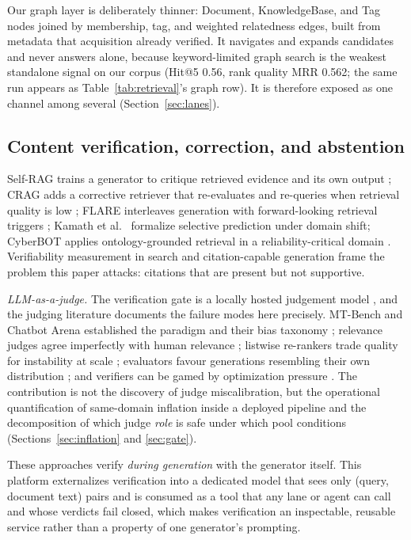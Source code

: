 Our graph layer is deliberately thinner: Document, KnowledgeBase, and Tag nodes
joined by membership, tag, and weighted relatedness edges, built from metadata
that acquisition already verified. It navigates and expands candidates and never
answers alone, because keyword-limited graph search is the weakest standalone
signal on our corpus (Hit@5 0.56, rank quality MRR 0.562; the same run
appears as Table~\ref{tab:retrieval}'s graph row). It is therefore exposed as one channel among
several (Section~\ref{sec:lanes}).

\subsection{Content verification, correction, and abstention}
Self-RAG trains a generator to critique retrieved evidence and its own output
\citep{selfrag}; CRAG adds a corrective retriever that re-evaluates and
re-queries when retrieval quality is low \citep{crag}; FLARE interleaves
generation with forward-looking retrieval triggers \citep{flare};
Kamath et al.~\citep{kamath} formalize selective prediction under domain shift; CyberBOT
applies ontology-grounded retrieval in a reliability-critical domain
\citep{cyberbot}. Verifiability measurement in search
\citep{liu-verifiability} and citation-capable generation \citep{gao-citations}
frame the problem this paper attacks: citations that are present but not
supportive.

\emph{LLM-as-a-judge.} The verification gate is a locally hosted judgement model
\citep{laya}, and the judging literature documents the failure modes here
precisely. MT-Bench and Chatbot Arena established the paradigm and their bias
taxonomy \citep{zheng-llmjudge}; relevance judges agree imperfectly with human
relevance \citep{sun-urara}; listwise re-rankers trade quality for instability
at scale \citep{rankgpt}; evaluators favour generations resembling their own
distribution \citep{panickssery-selfpref}; and verifiers can be gamed by
optimization pressure \citep{lightman-verify}. The contribution is not the
discovery of judge miscalibration, but the operational quantification of
same-domain inflation inside a deployed pipeline and the decomposition of which
judge \emph{role} is safe under which pool conditions
(Sections~\ref{sec:inflation} and \ref{sec:gate}).

These approaches verify \emph{during generation} with the generator itself.
This platform externalizes verification into a dedicated model that sees only
(query, document text) pairs and is consumed as a tool that any lane or agent
can call and whose verdicts fail closed, which makes verification an
inspectable, reusable service rather than a property of one generator's
prompting.

